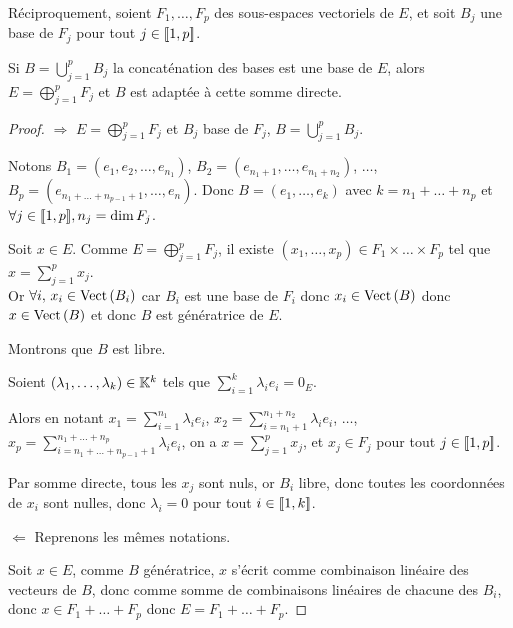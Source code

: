 \begin{theoreme}{}{}
    Réciproquement, soient $F_1, \dots, F_p$ des sous-espaces vectoriels de $E$, et soit 
    $B_j$ une base de $F_j$ pour tout $j \in [\![1, p]\!]$. 

    Si $\displaystyle B = \bigcup_{j=1}^p B_j$ la concaténation des bases est une base de $E$, alors
    $\displaystyle E = \bigoplus_{j=1}^p F_j$ et $B$ est adaptée à cette somme directe.
\end{theoreme}


\begin{proof}
    $\Rightarrow$ $E = \bigoplus_{j=1}^p F_j$ et $B_j$ base de $F_j$, $B = \bigcup_{j=1}^p B_j$. 

    Notons $B_1 = (e_1, e_2, \dots, e_{n_1})$, $B_2 = (e_{n_1 + 1}, \dots, e_{n_1 + n_2})$,
    $\dots$, $B_p = (e_{n_1 + \dots + n_{p-1} + 1}, \dots, e_n)$. Donc $B = (e_1, \dots, e_k)$ 
    avec $k = n_1 + \dots + n_p$ et $\forall j \in [\![1, p]\!], n_j = \dim F_j$.

    Soit $x \in E$. Comme $E = \bigoplus_{j=1}^p F_j$, il existe $(x_1, \dots, x_p) \in F_1 \times \dots \times F_p$ tel que
    $x = \sum_{j=1}^p x_j$. \\
    Or $\forall i, \, x_i \in \operatorname{Vect} \, (B_i)$ car $B_i$ est une base de $F_i$ donc
    $x_i \in \operatorname{Vect} \, (B)$ donc $x \in \operatorname{Vect} \, (B)$ et donc $B$ est génératrice de $E$.

    \svspace Montrons que $B$ est libre. 

    Soient $(\lambda_1, \dots, \lambda_k) \in \mathbb{K}^k$ tels que
    $\displaystyle \sum_{i=1}^k \lambda_i e_i = 0_E$.

    Alors en notant $\displaystyle x_1 = \sum_{i=1}^{n_1} \lambda_i e_i$,
    $\displaystyle x_2 = \sum_{i=n_1 + 1}^{n_1 + n_2} \lambda_i e_i$,
    $\dots$, $\displaystyle x_p = \sum_{i=n_1 + \dots + n_{p-1} + 1}^{n_1 + \dots + n_p} \lambda_i e_i$,
    on a $x = \sum_{j=1}^p x_j$, et $x_j \in F_j$ pour tout $j \in [\![1, p]\!]$.

    Par somme directe, tous les $x_j$ sont nuls, or $B_i$ libre, donc toutes les coordonnées de $x_i$ sont nulles, donc
    $\lambda_i = 0$ pour tout $i \in [\![1, k]\!]$.

    \lvspace $\Leftarrow$ Reprenons les mêmes notations. 

    Soit $x \in E$, comme $B$ génératrice, $x$ s'écrit comme combinaison linéaire 
    des vecteurs de $B$, donc comme somme de combinaisons linéaires de chacune 
    des $B_i$, donc $x \in F_1 + \dots + F_p$ donc $E = F_1 + \dots + F_p$.


\end{proof}
